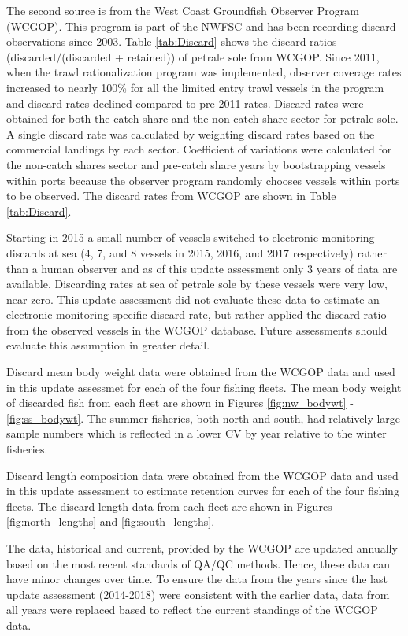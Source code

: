 \documentclass[12pt,]{article}
\begin{document}
The second source is from the West Coast Groundfish Observer Program
(WCGOP). This program is part of the NWFSC and has been recording
discard observations since 2003. Table \ref{tab:Discard} shows the
discard ratios (discarded/(discarded + retained)) of petrale sole from
WCGOP. Since 2011, when the trawl rationalization program was
implemented, observer coverage rates increased to nearly 100\% for all
the limited entry trawl vessels in the program and discard rates
declined compared to pre-2011 rates. Discard rates were obtained for
both the catch-share and the non-catch share sector for petrale sole. A
single discard rate was calculated by weighting discard rates based on
the commercial landings by each sector. Coefficient of variations were
calculated for the non-catch shares sector and pre-catch share years by
bootstrapping vessels within ports because the observer program randomly
chooses vessels within ports to be observed. The discard rates from
WCGOP are shown in Table \ref{tab:Discard}.

Starting in 2015 a small number of vessels switched to electronic
monitoring discards at sea (4, 7, and 8 vessels in 2015, 2016, and 2017
respectively) rather than a human observer and as of this update
assessment only 3 years of data are available. Discarding rates at sea
of petrale sole by these vessels were very low, near zero. This update
assessment did not evaluate these data to estimate an electronic
monitoring specific discard rate, but rather applied the discard ratio
from the observed vessels in the WCGOP database. Future assessments
should evaluate this assumption in greater detail.

Discard mean body weight data were obtained from the WCGOP data and used
in this update assessmet for each of the four fishing fleets. The mean
body weight of discarded fish from each fleet are shown in Figures
\ref{fig:nw_bodywt} - \ref{fig:ss_bodywt}. The summer fisheries, both
north and south, had relatively large sample numbers which is reflected
in a lower CV by year relative to the winter fisheries.

Discard length composition data were obtained from the WCGOP data and
used in this update assessment to estimate retention curves for each of
the four fishing fleets. The discard length data from each fleet are
shown in Figures \ref{fig:north_lengths} and \ref{fig:south_lengths}.

The data, historical and current, provided by the WCGOP are updated
annually based on the most recent standards of QA/QC methods. Hence,
these data can have minor changes over time. To ensure the data from the
years since the last update assessment (2014-2018) were consistent with
the earlier data, data from all years were replaced based to reflect the
current standings of the WCGOP data.
\end{document}
